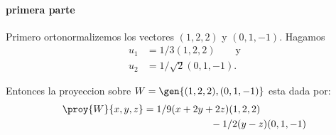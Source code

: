 	\paragraph{primera parte} Primero ortonormalizemos los vectores $(1,2,2)$ y $(0,1,-1)$. Hagamos
	\begin{align*}
	u_1 &= 1/3(1,2,2)\qquad\text{y}\\
	u_2 &= 1/\sqrt{2}(0,1,-1).
	\end{align*}
	
	Entonces la proyeccion sobre $W=\gen\{(1,2,2),(0,1,-1)\}$ esta dada por:
	\begin{align*}
		\proy{W}{x,y,z} &= 1/9(x+2y+2z)(1,2,2) \\
						&\phantom{=}\hspace*{6em}	- 1/2(y-z)(0,1,-1)
	\end{align*}
